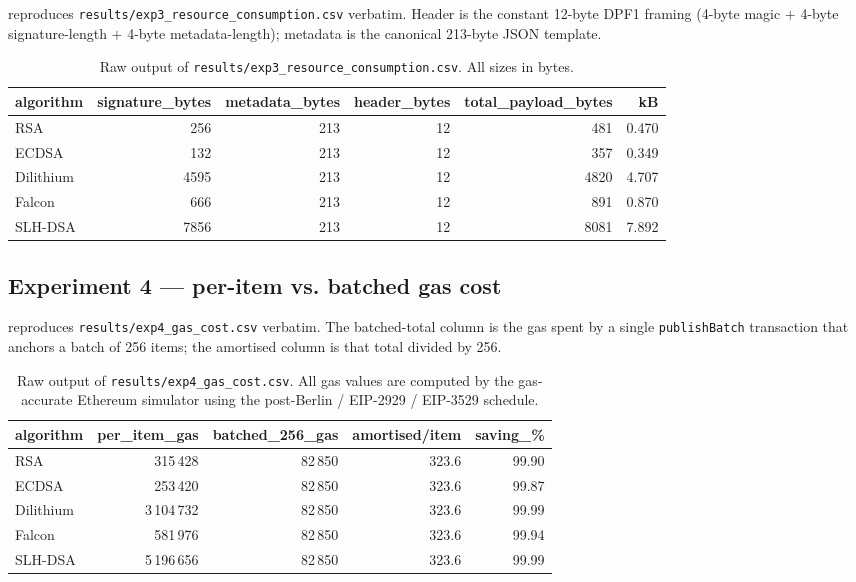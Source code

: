 \documentclass[11pt,a4paper]{article}
\begin{document}
 reproduces \texttt{results/exp3\_resource\_consumption.csv}
verbatim. Header is the constant 12-byte DPF1 framing (4-byte magic
$+$ 4-byte signature-length $+$ 4-byte metadata-length); metadata is
the canonical 213-byte JSON template.

\begin{table}[!ht]\centering
\caption{Raw output of \texttt{results/exp3\_resource\_consumption.csv}.
All sizes in bytes.}\label{tab:raw-exp3}
\small
\begin{tabular}{l r r r r r}
\toprule
algorithm & signature\_bytes & metadata\_bytes & header\_bytes & total\_payload\_bytes & kB \\
\midrule
RSA       &  256 & 213 & 12 &  481 & 0.470 \\
ECDSA     &  132 & 213 & 12 &  357 & 0.349 \\
Dilithium & 4595 & 213 & 12 & 4820 & 4.707 \\
Falcon    &  666 & 213 & 12 &  891 & 0.870 \\
SLH-DSA   & 7856 & 213 & 12 & 8081 & 7.892 \\
\bottomrule
\end{tabular}
\end{table}

\subsection{Experiment 4 --- per-item vs. batched gas cost}

 reproduces \texttt{results/exp4\_gas\_cost.csv}
verbatim. The batched-total column is the gas spent by a single
\texttt{publishBatch} transaction that anchors a batch of 256 items;
the amortised column is that total divided by 256.

\begin{table}[!ht]\centering
\caption{Raw output of \texttt{results/exp4\_gas\_cost.csv}.
All gas values are computed by the gas-accurate Ethereum simulator
using the post-Berlin / EIP-2929 / EIP-3529 schedule.}
\label{tab:raw-exp4}
\small
\setlength{\tabcolsep}{4pt}
\begin{tabular}{l r r r r}
\toprule
algorithm & per\_item\_gas & batched\_256\_gas & amortised/item & saving\_\% \\
\midrule
RSA       &    315\,428 & 82\,850 & 323.6 & 99.90 \\
ECDSA     &    253\,420 & 82\,850 & 323.6 & 99.87 \\
Dilithium & 3\,104\,732 & 82\,850 & 323.6 & 99.99 \\
Falcon    &    581\,976 & 82\,850 & 323.6 & 99.94 \\
SLH-DSA   & 5\,196\,656 & 82\,850 & 323.6 & 99.99 \\
\bottomrule
\end{tabular}
\end{table}
\end{document}
